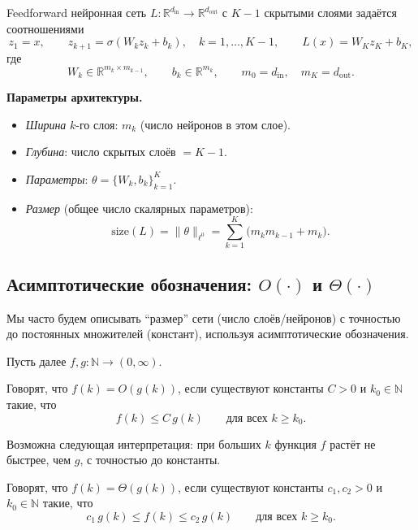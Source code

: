 \documentclass[../NDCNNAI_main.tex]{subfiles}
\begin{document}
\begin{definition}
Feedforward нейронная сеть $L\colon \mathbb{R}^{d_{\mathrm{in}}}\to \mathbb{R}^{d_{\mathrm{out}}}$ с $K-1$ скрытыми слоями задаётся соотношениями
$$
z_1 = x,\qquad
z_{k+1} = \sigma(W_k z_k + b_k),\quad k=1,\ldots,K-1,\qquad
L(x)= W_K z_K + b_K,
$$
где
$$
W_k \in \mathbb{R}^{m_k\times m_{k-1}},\qquad
b_k \in \mathbb{R}^{m_k},\qquad
m_0=d_{\mathrm{in}},\quad m_K=d_{\mathrm{out}}.
$$
\end{definition}

\textbf{Параметры архитектуры.}
\begin{itemize}
  \item \emph{Ширина} $k$-го слоя: $m_k$ (число нейронов в этом слое).
  \item \emph{Глубина}: число скрытых слоёв $=K-1$.
  \item \emph{Параметры}: $\theta=\{W_k,b_k\}_{k=1}^{K}$.
  \item \emph{Размер} (общее число скалярных параметров):
  $$
  \mathrm{size}(L)=\|\theta\|_{\ell^0}
  =\sum_{k=1}^{K}\bigl(m_k m_{k-1}+m_k\bigr).
  $$
\end{itemize}

\subsection{Асимптотические обозначения: $O(\cdot)$ и $\Theta(\cdot)$}

Мы часто будем описывать ``размер'' сети (число слоёв/нейронов) с точностью до постоянных множителей (констант), используя асимптотические обозначения.

Пусть далее $f,g\colon \mathbb{N}\to (0,\infty)$.

\begin{definition}
Говорят, что $f(k)=O(g(k))$, если существуют константы $C>0$ и $k_0\in\mathbb{N}$ такие, что
$$
f(k)\le C\,g(k)\qquad \text{для всех } k\ge k_0.
$$
\end{definition}

\begin{remark}
Возможна следующая интерпретация: при больших $k$ функция $f$ растёт не быстрее, чем $g$, с точностью до константы.
\end{remark}

\begin{definition}
Говорят, что $f(k)=\Theta(g(k))$, если существуют константы $c_1,c_2>0$ и $k_0\in\mathbb{N}$ такие, что
$$
c_1\,g(k)\le f(k)\le c_2\,g(k)\qquad \text{для всех } k\ge k_0.
$$
\end{definition}
\end{document}
